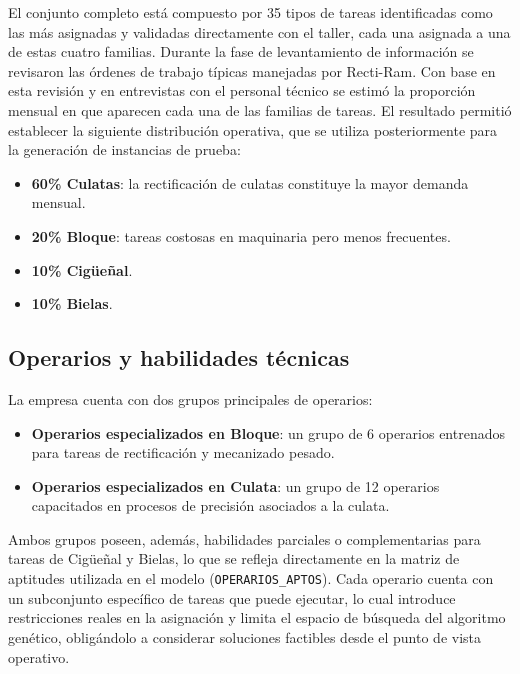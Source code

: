 El conjunto completo está compuesto por 35 tipos de tareas identificadas como las más asignadas y validadas directamente con el taller, cada una asignada a una de estas cuatro familias. Durante la fase de levantamiento de información se revisaron las órdenes de trabajo típicas manejadas por Recti-Ram. Con base en esta revisión y en entrevistas con el personal técnico se estimó la proporción mensual en que aparecen cada una de las familias de tareas. El resultado permitió establecer la siguiente distribución operativa, que se utiliza posteriormente para la generación de instancias de prueba:
\begin{itemize}
    \item \textbf{60\% Culatas}: la rectificación de culatas constituye la mayor demanda mensual.
    \item \textbf{20\% Bloque}: tareas costosas en maquinaria pero menos frecuentes.
    \item \textbf{10\% Cigüeñal}.
    \item \textbf{10\% Bielas}.
\end{itemize}

\subsection{Operarios y habilidades técnicas}

La empresa cuenta con dos grupos principales de operarios:
\begin{itemize}
    \item \textbf{Operarios especializados en Bloque}: un grupo de 6 operarios entrenados para tareas de rectificación y mecanizado pesado.
    \item \textbf{Operarios especializados en Culata}: un grupo de 12 operarios capacitados en procesos de precisión asociados a la culata.
\end{itemize}

Ambos grupos poseen, además, habilidades parciales o complementarias para tareas de Cigüeñal y 
Bielas, lo que se refleja directamente en la matriz de aptitudes utilizada en el 
modelo (\texttt{OPERARIOS\_APTOS}). Cada operario cuenta con un subconjunto específico 
de tareas que puede ejecutar, lo cual introduce restricciones reales en la asignación y 
limita el espacio de búsqueda del algoritmo genético, obligándolo a considerar soluciones 
factibles desde el punto de vista operativo.
